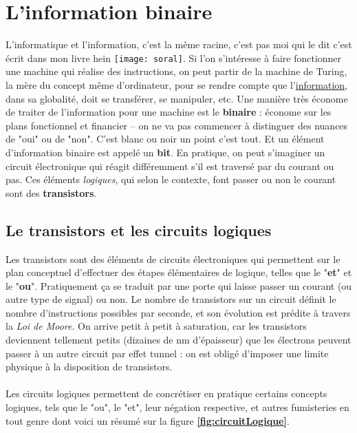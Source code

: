 \documentclass[12pt,a4paper]{report}
\author{Sami \textsc{Abdul Sater}}
\date{\hspace{-0.6cm}Année académique 2019-2020}
\begin{document}

\tableofcontents
\chapter{L'information binaire}
L'informatique et l'information, c'est la même racine, c'est pas moi qui le dit c'est écrit dans mon livre hein \texttt{[image: soral]}. Si l'on s'intéresse à faire fonctionner une machine qui réalise des instructions, on peut partir de la machine de Turing, la mère du concept même d'ordinateur, pour se rendre compte que l'\underline{information}, dans sa globalité, doit se transférer, se manipuler, etc. Une manière très économe de traiter de l'information pour une machine est le \textbf{binaire} : économe sur les plans fonctionnel et financier -- on ne va pas commencer à distinguer des nuances de "oui" ou de "non". C'est blanc ou noir un point c'est tout. Et un élément d'information binaire est appelé un \textbf{bit}. En pratique, on peut s'imaginer un circuit électronique qui réagit différemment s'il est traversé par du courant ou pas. Ces éléments \textit{logiques}, qui selon le contexte, font passer ou non le courant sont des \textbf{transistors}.
\section{Le transistors et les circuits logiques}
Les transistors sont des éléments de circuits électroniques qui permettent sur le plan conceptuel d'effectuer des étapes élémentaires de logique, telles que le "\textbf{et}" et le "\textbf{ou}". Pratiquement ça se traduit par une porte qui laisse passer un courant (ou autre type de signal) ou non. Le nombre de transistors  sur un circuit définit le nombre d'instructions possibles par seconde, et son évolution est prédite à travers la \textit{Loi de Moore}. On arrive petit à petit à saturation, car les transistors deviennent tellement petits (dizaines de nm d'épaisseur) que les électrons peuvent passer à un autre circuit par effet tunnel : on est obligé d'imposer une limite physique à la disposition de transistors.\\
\\
Les circuits logiques permettent de concrétiser en pratique certains concepts logiques, tels que le "ou", le "et", leur négation respective, et autres fumisteries en tout genre dont voici un résumé sur la figure \textbf{\ref{fig:circuitLogique}}.
\end{document}
